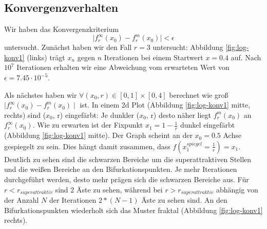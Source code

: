 \documentclass[12pt,a4paper]{article}
\begin{document}
\subsection{Konvergenzverhalten}
Wir haben das Konvergenzkriterium 
\begin{equation}
\mid f^{\infty}_r(x_0)-f^{m}_r(x_0)\mid < \epsilon
\end{equation}
untersucht. 
Zunächst haben wir den Fall $r=3$ untersucht: Abbildung \ref{fig:log-konv1} (links) trägt $x_n$ gegen $n$ Iterationen bei einem Startwert $x=0.4$ auf. Nach $10^7$ Iterationen erhalten wir eine Abweichung vom erwarteten Wert von $\epsilon=7.45 \cdot 10^{-5}$.


Als nächstes haben wir $\forall (x_0, r) \in [0,1] \times [0,4]$  berechnet wie groß $\mid f^{\infty}_r(x_0)-f^{m}_r(x_0)\mid $ ist. 
In einem 2d Plot (Abbildung \ref{fig:log-konv1} mitte, rechts) sind ($x_0$, r) eingefärbt: Je dunkler ($x_0$, r) desto näher liegt $f^{m}_r(x_0)$ an $f^{\infty}_r(x_0)$. 
Wie zu erwarten ist der Fixpunkt $x_1=1-\frac{1}{r}$ dunkel eingefärbt (Abbildung \ref{fig:log-konv1} mitte). Der Graph scheint an der $x_0=0.5$ Achse gespiegelt zu sein. Dies hängt damit zusammen, dass $f(x^{spiegel}_{1}=\frac{1}{r}) = x_1$. 
Deutlich zu sehen sind die schwarzen Bereiche um die superattraktiven Stellen und die weißen Bereiche an den Bifurkationspunkten. Je mehr Iterationen durchgeführt werden, desto mehr prägen sich die schwarzen Bereiche aus. Für $r < r_{superattraktiv}$ sind 2 Äste zu sehen, während bei $r > r_{superattraktiv}$ abhängig von der Anzahl $N$ der Iterationen $2*(N-1)$ Äste zu sehen sind. An den Bifurkationspunkten wiederholt sich das Muster fraktal (Abbildung \ref{fig:log-konv1} rechts). 
\end{document}
